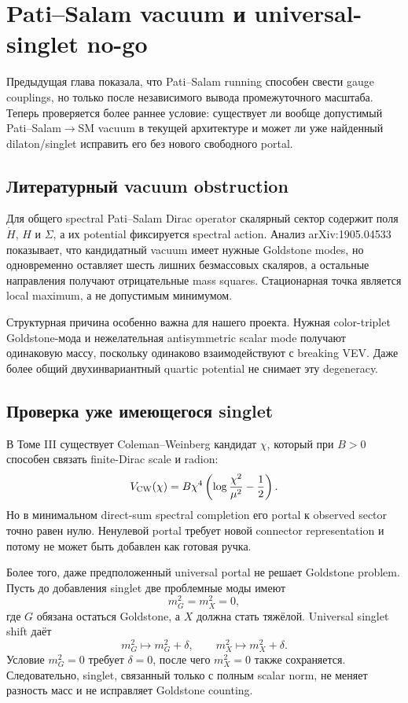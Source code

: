 \chapter{Pati--Salam vacuum и universal-singlet no-go}

Предыдущая глава показала, что Pati--Salam running способен свести gauge
couplings, но только после независимого вывода промежуточного масштаба.
Теперь проверяется более раннее условие: существует ли вообще допустимый
Pati--Salam\(\to\)SM vacuum в текущей архитектуре и может ли уже найденный
dilaton/singlet исправить его без нового свободного portal.

\section{Литературный vacuum obstruction}

Для общего spectral Pati--Salam Dirac operator скалярный сектор содержит
поля \(\dot H\), \(H\) и \(\Sigma\), а их potential фиксируется spectral
action. Анализ arXiv:1905.04533 показывает, что кандидатный vacuum имеет
нужные Goldstone modes, но одновременно оставляет шесть лишних безмассовых
скаляров, а остальные направления получают отрицательные mass squares.
Стационарная точка является local maximum, а не допустимым минимумом.

Структурная причина особенно важна для нашего проекта. Нужная color-triplet
Goldstone-мода и нежелательная antisymmetric scalar mode получают одинаковую
массу, поскольку одинаково взаимодействуют с breaking VEV. Даже более общий
двухинвариантный quartic potential не снимает эту degeneracy.

\section{Проверка уже имеющегося singlet}

В Томе III существует Coleman--Weinberg кандидат \(\chi\), который при
\(B>0\) способен связать finite-Dirac scale и radion:
\begin{equation}
 V_{\rm CW}(\chi)=B\chi^4
 \left(\log\frac{\chi^2}{\mu^2}-\frac12\right).
\end{equation}
Но в минимальном direct-sum spectral completion его portal к observed
sector точно равен нулю. Ненулевой portal требует новой connector
representation и потому не может быть добавлен как готовая ручка.

Более того, даже предположенный universal portal не решает Goldstone problem.
Пусть до добавления singlet две проблемные моды имеют
\begin{equation}
 m_G^2=m_X^2=0,
\end{equation}
где \(G\) обязана остаться Goldstone, а \(X\) должна стать тяжёлой. Universal
singlet shift даёт
\begin{equation}
 m_G^2\longmapsto m_G^2+\delta,
 \qquad
 m_X^2\longmapsto m_X^2+\delta.
\end{equation}
Условие \(m_G^2=0\) требует \(\delta=0\), после чего \(m_X^2=0\) также
сохраняется. Следовательно, singlet, связанный только с полным scalar norm,
не меняет разность масс и не исправляет Goldstone counting.

